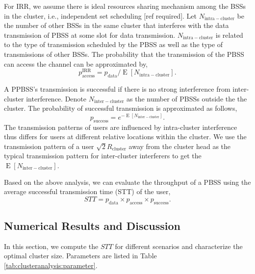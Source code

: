 \documentclass[10pt, conference, letterpaper]{IEEEtran}
\DeclareMathOperator*{\E}{\mathrm{E}}
\begin{document}
For IRR, we assume there is ideal resources sharing mechanism among the BSSs in the cluster, i.e., independent set scheduling [ref required]. Let $N_{\mathrm{intra-cluster}}$ be the number of other BSSs in the same cluster that interferes with the data transmission of PBSS at some slot for data transmission. $N_{\mathrm{intra-cluster}}$ is related to the type of transmission scheduled by the PBSS as well as the type of transmissions of other BSSs. The probability that the transmission of the PBSS can access the channel can be approximated by, 
\begin{equation*}
p_{\mathrm{access}}^{\mathrm{IRR}} = p_{\mathrm{data}}/\E[N_{\mathrm{intra-cluster}}].
\end{equation*} 

A PPBSS's transmission is successful if there is no strong interference from inter-cluster interference. Denote $N_{\mathrm{inter-cluster}}$ as the number of PBSSs outside the the cluster. The probability of successful transmission is approximated as follows, 
\begin{equation*}
p_{\mathrm{success}} = e^{-\E[N_{\mathrm{inter-cluster}}]}.
\end{equation*} 
The transmission patterns of users are influenced by intra-cluster interference thus differs for users at different relative locations within the cluster. We use the transmission pattern of a user $\sqrt{2}R_{\mathrm{cluster}}$ away from the cluster head as the typical transmission pattern for inter-cluster interferers to get the $\E[N_{\mathrm{inter-cluster}}]$.

Based on the above analysis, we can evaluate the throughput of a PBSS using the average successful transmission time (STT) of the user,
\begin{equation*}
STT = p_{\mathrm{data}}\times p_{\mathrm{access}} \times p_{\mathrm{success}}.
\end{equation*}

\subsection{Numerical Results and Discussion}
In this section, we compute the $STT$ for different scenarios and characterize the optimal cluster size. 
Parameters are listed in Table \ref{tab:clusteranalysis:parameter}.
\end{document}
